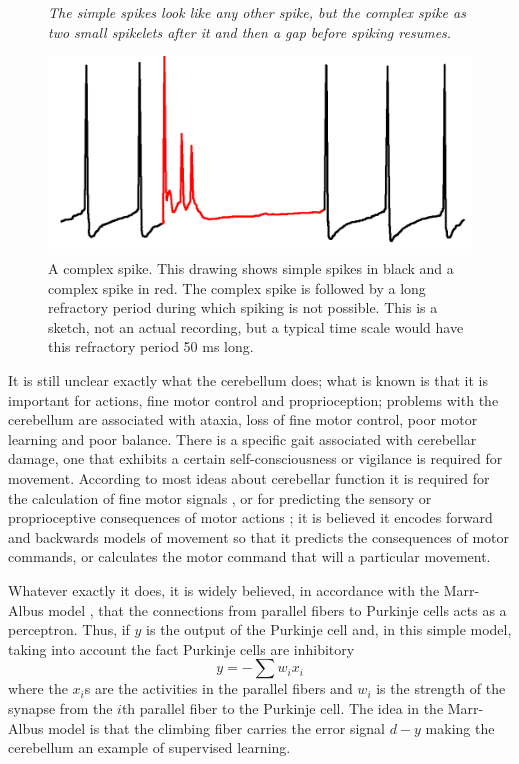 \documentclass[12pt]{article}
\begin{document}
\begin{figure}
             {{\textsl{The simple spikes look like any other spike, but the complex spike as two small spikelets after it and then a gap before spiking resumes.
             }}}
             {
  \begin{center}
\includegraphics[width=8.cm]{complex_spike.png}
  \end{center}
  }
\caption{A complex spike. This drawing shows simple spikes in black
  and a complex spike in red. The complex spike is followed by a long
  refractory period during which spiking is not possible. This is a
  sketch, not an actual recording, but a typical time scale would have
  this refractory period 50 ms long.\label{fig:spikes}}
\end{figure}

It is still unclear exactly what the cerebellum does; what is known is
that it is important for actions, fine motor control and
proprioception; problems with the cerebellum are associated with
ataxia, loss of fine motor control, poor motor learning and poor
balance. There is a specific gait associated with cerebellar damage,
one that exhibits a certain self-consciousness or vigilance is
required for movement. According to most ideas about cerebellar
function it is required for the calculation of fine motor signals
\cite{Albus1971a}, or for predicting the sensory or proprioceptive
consequences of motor actions \cite{GaoEtAl1996a}; it is believed it
encodes forward and backwards models of movement so that it predicts
the consequences of motor commands, or calculates the motor command
that will a particular movement.

Whatever exactly it does, it is widely believed, in accordance with
the Marr-Albus model \cite{Marr1969a,Albus1971a}, that the connections
from parallel fibers to Purkinje cells acts as a perceptron. Thus, if
$y$ is the output of the Purkinje cell and, in this simple model,
taking into account the fact Purkinje cells are inhibitory
\begin{equation}
y=-\sum{w_ix_i}
\end{equation}
where the $x_i$s are the activities in the parallel fibers and $w_i$
is the strength of the synapse from the $i$th parallel fiber to the
Purkinje cell. The idea in the Marr-Albus model is that the climbing
fiber carries the error signal $d-y$ making the cerebellum an example
of supervised learning.
\end{document}
